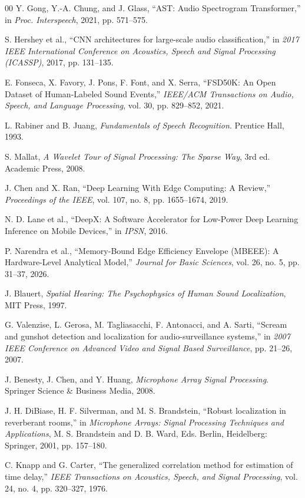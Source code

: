 \documentclass[conference]{IEEEtran}
\begin{document}
\begin{thebibliography}{00}
 Y. Gong, Y.-A. Chung, and J. Glass, ``AST: Audio Spectrogram Transformer,'' in \textit{Proc. Interspeech}, 2021, pp. 571--575.

 S. Hershey et al., ``CNN architectures for large-scale audio classification,'' in \textit{2017 IEEE International Conference on Acoustics, Speech and Signal Processing (ICASSP)}, 2017, pp. 131--135.

 E. Fonseca, X. Favory, J. Pons, F. Font, and X. Serra, ``FSD50K: An Open Dataset of Human-Labeled Sound Events,'' \textit{IEEE/ACM Transactions on Audio, Speech, and Language Processing}, vol. 30, pp. 829--852, 2021.

 L. Rabiner and B. Juang, \textit{Fundamentals of Speech Recognition}. Prentice Hall, 1993.

 S. Mallat, \textit{A Wavelet Tour of Signal Processing: The Sparse Way}, 3rd ed. Academic Press, 2008.

 J. Chen and X. Ran, ``Deep Learning With Edge Computing: A Review,'' \textit{Proceedings of the IEEE}, vol. 107, no. 8, pp. 1655--1674, 2019.

 N. D. Lane et al., ``DeepX: A Software Accelerator for Low-Power Deep Learning Inference on Mobile Devices,'' in \textit{IPSN}, 2016.

 P. Narendra et al., ``Memory-Bound Edge Efficiency Envelope (MBEEE): A Hardware-Level Analytical Model,'' \textit{Journal for Basic Sciences}, vol. 26, no. 5, pp. 31--37, 2026.

 J. Blauert, \textit{Spatial Hearing: The Psychophysics of Human Sound Localization}, MIT Press, 1997.

 G. Valenzise, L. Gerosa, M. Tagliasacchi, F. Antonacci, and A. Sarti, ``Scream and gunshot detection and localization for audio-surveillance systems,'' in \textit{2007 IEEE Conference on Advanced Video and Signal Based Surveillance}, pp. 21--26, 2007.

 J. Benesty, J. Chen, and Y. Huang, \textit{Microphone Array Signal Processing}. Springer Science \& Business Media, 2008.

 J. H. DiBiase, H. F. Silverman, and M. S. Brandstein, ``Robust localization in reverberant rooms,'' in \textit{Microphone Arrays: Signal Processing Techniques and Applications}, M. S. Brandstein and D. B. Ward, Eds. Berlin, Heidelberg: Springer, 2001, pp. 157--180.

 C. Knapp and G. Carter, ``The generalized correlation method for estimation of time delay,'' \textit{IEEE Transactions on Acoustics, Speech, and Signal Processing}, vol. 24, no. 4, pp. 320--327, 1976.


\end{thebibliography}
\end{document}
